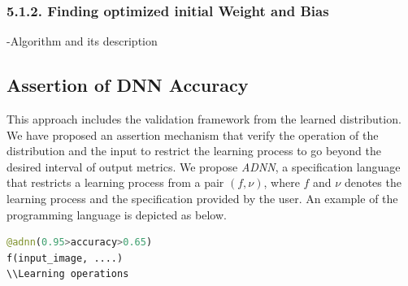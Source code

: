 \subsubsection{5.1.2. Finding optimized initial Weight and Bias}
-Algorithm and its description
\subsection{Assertion of DNN Accuracy}
This approach includes the validation framework from the learned distribution. We have proposed an assertion mechanism that verify the operation of the distribution and the input to restrict the learning process to go beyond the desired interval of output metrics. We propose \emph{ADNN}, a specification language that restricts a learning process from a pair $(f,\nu)$, where $f$ and $\nu$ denotes the learning process and the specification provided by the user. An example of the programming language is depicted as below.
\begin{lstlisting}[language=Python, caption=Accountable specification language]
@adnn(0.95>accuracy>0.65)
f(input_image, ....)
\\Learning operations
\end{lstlisting}